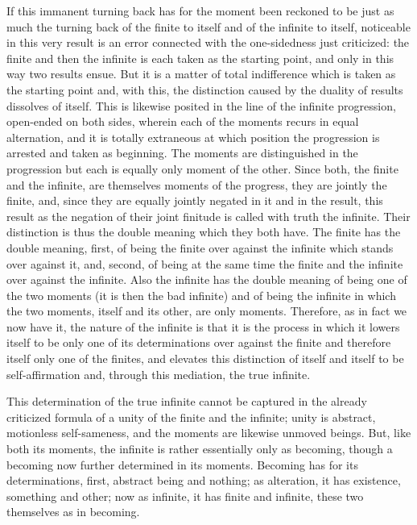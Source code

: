 If this immanent turning back has for the moment been reckoned
to be just as much the turning back of the finite to itself
and of the infinite to itself,
noticeable in this very result is an error connected
with the one-sidedness just criticized:
the finite and then the infinite is
each taken as the starting point,
and only in this way two results ensue.
But it is a matter of total indifference
which is taken as the starting point
and, with this, the distinction caused
by the duality of results dissolves of itself.
This is likewise posited in the line
of the infinite progression,
open-ended on both sides,
wherein each of the moments
recurs in equal alternation,
and it is totally extraneous
at which position the progression is
arrested and taken as beginning.
The moments are distinguished in the progression
but each is equally only moment of the other.
Since both, the finite and the infinite,
are themselves moments of the progress,
they are jointly the finite,
and, since they are equally jointly
negated in it and in the result,
this result as the negation
of their joint finitude is
called with truth the infinite.
Their distinction is thus the
double meaning which they both have.
The finite has the double meaning,
first, of being the finite over against the infinite
which stands over against it,
and, second, of being at the same time
the finite and the infinite over against the infinite.
Also the infinite has the double meaning
of being one of the two moments
(it is then the bad infinite)
and of being the infinite in which the two moments,
itself and its other, are only moments.
Therefore, as in fact we now have it,
the nature of the infinite is
that it is the process in which it lowers itself
to be only one of its determinations over against the finite
and therefore itself only one of the finites,
and elevates this distinction of itself
and itself to be self-affirmation
and, through this mediation, the true infinite.

This determination of the true infinite
cannot be captured in the already criticized formula
of a unity of the finite and the infinite;
unity is abstract, motionless self-sameness,
and the moments are likewise unmoved beings.
But, like both its moments, the infinite is
rather essentially only as becoming,
though a becoming now further determined in its moments.
Becoming has for its determinations,
first, abstract being and nothing;
as alteration, it has existence, something and other;
now as infinite, it has finite and infinite,
these two themselves as in becoming.

